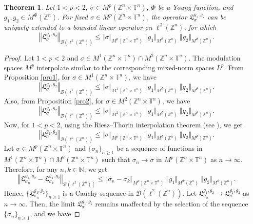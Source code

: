 \documentclass[a4paper,11pt, reqno]{amsart}
\theoremstyle{plain}
\newtheorem{theorem}{Theorem}[section]
\theoremstyle{definition}
\theoremstyle{remark}
\def \Z{{\mathbb Z}}
\def \T{{\mathbb T}}
\begin{document}
\begin{theorem}\label{th1}
Let $1 < p < 2$, $\sigma \in M^p(\Z^n \times \T^n)$, $\Phi$ be a Young function, and $g_1, g_2 \in  M^{\Phi}(\Z^n)$. For fixed $\sigma \in M^p(\Z^n \times \T^n)$, the operator $\mathfrak{L}^{g_1, g_2}_{\sigma}$ can be uniquely extended to a bounded linear operator on $\ell^2(\Z^n)$, for which
\[ \left\Vert \mathfrak{L}^{g_1, g_2}_{\sigma} \right\Vert_{\mathcal{B}(\ell^2(\Z^n))} \leq \Vert \sigma \Vert_{M^p(\Z^n \times \T^n)} \; \Vert g_1 \Vert_{M^{\Phi}(\Z^n)} \; \Vert g_2 \Vert_{M^{\Phi}(\Z^n)}. \] 
\end{theorem} 
\begin{proof}
Let $1< p < 2$ and $\sigma \in M^1(\Z^n \times \T^n) \cap  M^2(\Z^n \times \T^n)$. The modulation spaces $M^{p}$ interpolate similar to the corresponding mixed-norm spaces $L^{p}$. From Proposition \ref{pro1}, for $\sigma \in M^1(\Z^n \times \T^n)$, we have 
$$\left\Vert \mathfrak{L}^{g_1, g_2}_{\sigma} \right\Vert_{\mathcal{B}(\ell^2(\Z^n))} \leq \Vert \sigma \Vert_{M^1(\Z^n \times \T^n)} \; \Vert g_1 \Vert_{M^{\Phi}(\Z^n)} \; \Vert g_2 \Vert_{M^{\Phi}(\Z^n)}.$$
Also, from Proposition \ref{pro2}, for $\sigma \in M^2(\Z^n \times \T^n)$, we have
\[ \left\Vert \mathfrak{L}^{g_1, g_2}_{\sigma} \right\Vert_{\mathcal{B}(\ell^2(\Z^n))} \leq \Vert \sigma \Vert_{M^2(\Z^n \times \T^n)} \; \Vert g_1 \Vert_{M^{\Phi}(\Z^n)} \; \Vert g_2 \Vert_{M^{\Phi}(\Z^n)}. \]
Now, for $1< p < 2$, using the Riesz--Thorin interpolation theorem (see \cite{ste56}), we get 
\[ \left\Vert \mathfrak{L}^{g_1, g_2}_{\sigma} \right\Vert_{\mathcal{B}(\ell^2(\Z^n))} \leq \Vert \sigma \Vert_{M^p(\Z^n \times \T^n)} \; \Vert g_1 \Vert_{M^{\Phi}(\Z^n)} \; \Vert g_2 \Vert_{M^{\Phi}(\Z^n)} . \] 
Let $\sigma \in M^p(\Z^n \times \T^n)$ and $\{ \sigma_n \}_{n \geq 1}$ be a sequence of functions in $M^1(\Z^n \times \T^n) \cap M^2(\Z^n \times \T^n)$ such that $\sigma_n \to \sigma$ in $M^p(\Z^n \times \T^n)$ as $ n \to \infty$. Therefore, for any $n, k \in \mathbb{N}$, we get
\[ \left\Vert \mathfrak{L}^{g_1, g_2}_{\sigma_n} - \mathfrak{L}^{g_1, g_2}_{\sigma_k} \right\Vert_{\mathcal{B}(\ell^2(\Z^n))} \leq \Vert \sigma_n - \sigma_k \Vert_{M^p(\Z^n \times \T^n)} \; \Vert g_1 \Vert_{M^{\Phi}(\Z^n)} \; \Vert g_2 \Vert_{M^{\Phi}(\Z^n)} . \]   
Hence, $\{ \mathfrak{L}^{g_1, g_2}_{\sigma_n} \}_{n \geq 1}$ is a Cauchy sequence in $\mathcal{B}(\ell^2(\Z^n))$. Let $ \mathfrak{L}^{g_1, g_2}_{\sigma_n} \to \mathfrak{L}^{g_1, g_2}_{\sigma}$ as $ n \to \infty$. Then, the limit $ \mathfrak{L}^{g_1, g_2}_{\sigma}$ remains unaffected by the selection of the sequence $\{ \sigma_n \}_{n \geq 1}$, and we have

\end{proof}
\end{document}

